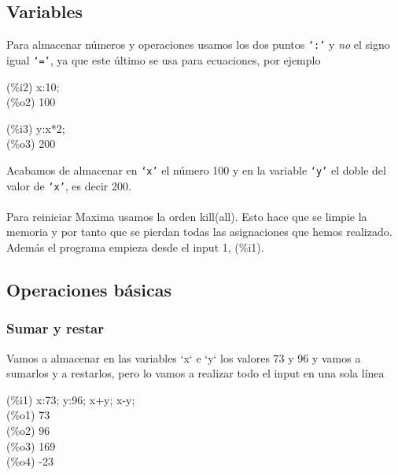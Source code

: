 \documentclass[a4paper, 12pt] {article}
\begin{document}
\subsection{Variables}
Para almacenar números y operaciones usamos los dos puntos \texttt{`:'} y \emph{no} el signo igual \texttt{`='}, ya que este último se usa para ecuaciones, por ejemplo
\begin{center}
  (\%i2) x:10;\\(\%o2) 100
\end{center}
\begin{center}
    (\%i3) y:x*2;\\(\%o3) 200
\end{center}
Acabamos de almacenar en \texttt{`x'} el número 100 y en la variable \texttt{`y'} el doble del valor de \texttt{`x'}, es decir 200.\\\\
Para reiniciar Maxima usamos la orden kill(all). Esto hace que se limpie la memoria y por tanto que se pierdan todas las asignaciones que hemos realizado. Además el programa empieza desde el input 1, (\%i1).
\pagebreak
\subsection{Operaciones básicas}
\subsubsection{Sumar y restar}
Vamos a almacenar en las variables `x` e `y` los valores 73 y 96 y vamos a sumarlos y a restarlos, pero lo vamos a realizar todo el input en una sola línea
\begin{center}
  (\%i1) x:73; y:96; x+y; x-y; \\(\%o1) 73 \\(\%o2) 96 \\(\%o3) 169 \\(\%o4) -23
\end{center}
\end{document}
